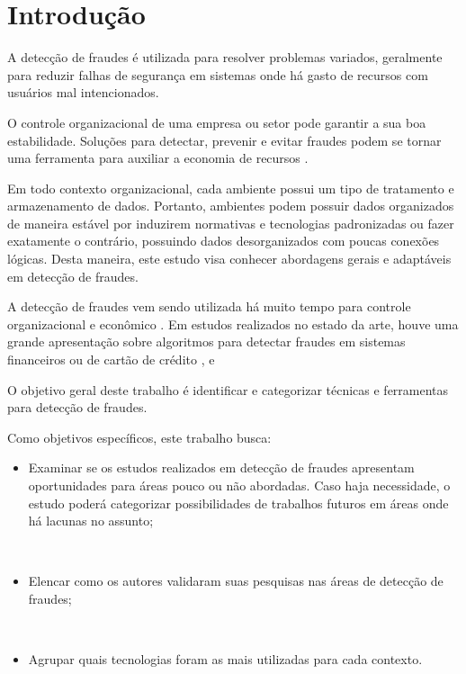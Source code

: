 \documentclass[smallextended]{svjour3}
\begin{document}
\section{Introdução}
\label{sec:1}

A detecção de fraudes é utilizada para resolver problemas variados, geralmente para reduzir falhas de segurança em sistemas onde há gasto de recursos com usuários mal intencionados.

O controle organizacional de uma empresa ou setor pode garantir a sua boa estabilidade. Soluções para detectar, prevenir e evitar fraudes podem se tornar uma ferramenta para auxiliar a economia de recursos \citep{809570}. 

Em todo contexto organizacional, cada ambiente possui um tipo de tratamento e armazenamento de dados. Portanto, ambientes podem possuir dados organizados de maneira estável por induzirem normativas e tecnologias padronizadas ou fazer exatamente o contrário, possuindo dados desorganizados com poucas conexões lógicas. Desta maneira, este estudo visa conhecer abordagens gerais e adaptáveis em detecção de fraudes.

A detecção de fraudes vem sendo utilizada há muito tempo para controle organizacional e econômico \citep{Seyedhossein2010}. Em estudos realizados no estado da arte, houve uma grande apresentação sobre algoritmos para detectar fraudes em sistemas financeiros ou de cartão de crédito \citep{809570}, \citep{Chandola:2009:ADS:1541880.1541882} e \citep{Abdallah2016}

O objetivo geral deste trabalho é identificar e categorizar técnicas e ferramentas para detecção de fraudes.

Como objetivos específicos, este trabalho busca:

\begin{itemize}
	\item Examinar se os estudos realizados em detecção de fraudes apresentam oportunidades para áreas pouco ou não abordadas. Caso haja necessidade, o estudo poderá categorizar possibilidades de trabalhos futuros em áreas onde há lacunas no assunto;
	
	\
	
	\item Elencar como os autores validaram suas pesquisas nas áreas de detecção de fraudes;
	
	\
		
	\item Agrupar quais tecnologias foram as mais utilizadas para cada contexto.
\end{itemize}
\end{document}
